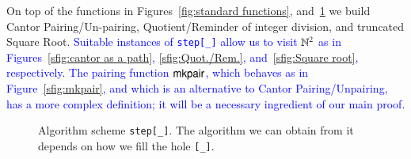 \documentclass[preprint]{elsarticle}
\theoremstyle{remark}
\begin{document}
On top of the functions in Figures~\ref{fig:standard functions}, and~\ref{fig:function scheme step} we build Cantor Pairing/Un-pairing, Quotient/Reminder of integer division, and truncated Square Root. \textcolor{blue}{Suitable instances of \lstinline|step[_]| allow us to visit $ \mathbb{N}^2 $ as in Figures~\ref{sfig:cantor as a path}, \ref{sfig:Quot./Rem.}, and~\ref{sfig:Square root}, respectively. The pairing function $\mathsf{mkpair}$, which behaves as in Figure~\ref{sfig:mkpair}, and which is an alternative to Cantor Pairing/Unpairing, has a more complex definition; it will be a necessary ingredient of our main proof.}

\begin{figure}
    \centering
    \caption{Algorithm scheme \lstinline|step[_]|. The algorithm we can obtain from it depends on how we fill the hole \lstinline|[_]|.}
    \label{fig:function scheme step}
\end{figure}
\end{document}
